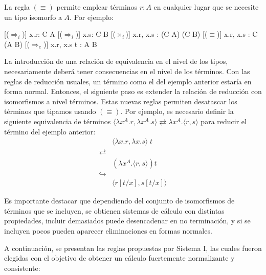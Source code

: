 La regla $(\equiv)$ permite emplear términos $r:A$ en cualquier lugar que se necesite un tipo isomorfo a $A$. Por ejemplo:

\begin{prooftree*}
	[($\Rightarrow_i$)]{ \Gamma\vdash \lambda x.r: C \Rightarrow A }
	[($\Rightarrow_i$)]{ \Gamma\vdash \lambda x.s: C \Rightarrow B }
	[($\times_i$)]{ \Gamma\vdash \langle \lambda x.r, \lambda x.s \rangle : (C \Rightarrow A) \times (C \Rightarrow B) }
	[($\equiv$)]{ \Gamma\vdash \langle \lambda x.r, \lambda x.s \rangle : C \Rightarrow (A \times B) }
	[($\Rightarrow_e$)]{ \Gamma\vdash \langle \lambda x.r, \lambda x.s \rangle \; t : A \times B }
\end{prooftree*}

La introducción de una relación de equivalencia en el nivel de los tipos, necesariamente deberá tener consecuencias en el nivel de los términos.
Con las reglas de reducción usuales, un término como el del ejemplo anterior estaría en forma normal.
Entonces, el siguiente paso es extender la relación de reducción con isomorfismos a nivel términos.
Estas nuevas reglas permiten desatascar los términos que tipamos usando $(\equiv)$.
Por ejemplo, es necesario definir la siguiente equivalencia de términos $\langle \lambda x^A.r, \lambda x^A.s \rangle \rightleftarrows \lambda x^A. \langle r, s \rangle$ para reducir el término del ejemplo anterior:
\begin{align*}
	& \langle \lambda x.r, \lambda x.s \rangle \; t \\
	\rightleftarrows& \\
	& (\lambda x^A. \langle r, s \rangle) t \\
	\hookrightarrow& \\
	& \langle r[t/x], s[t/x] \rangle
\end{align*}

Es importante destacar que dependiendo del conjunto de isomorfismos de términos que se incluyen, se obtienen sistemas de cálculo con distintas propiedades, incluir demasiados puede desencadenar en no terminación, y si se incluyen pocos pueden aparecer eliminaciones en formas normales.

A continuación, se presentan las reglas propuestas por Sistema I, las cuales fueron elegidas con el objetivo de obtener un cálculo fuertemente normalizante y consistente:

